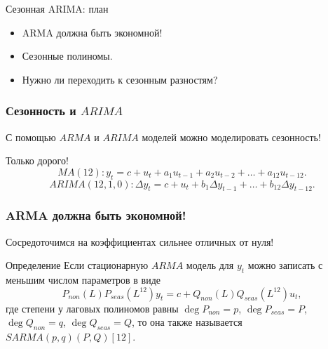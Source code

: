 
\begin{frame} %


\end{frame}



\begin{frame}{Сезонная ARIMA: план}
  \begin{itemize}[<+->]
    \item ARMA должна быть экономной! 
    \item Сезонные полиномы.
    \item Нужно ли переходить к сезонным разностям?
  \end{itemize}

\end{frame}


\begin{frame}
  \frametitle{Сезонность и $ARIMA$}

  С помощью $ARMA$ и $ARIMA$ моделей можно моделировать сезонность!

  \pause
  Только \alert{дорого}!\pause
  \[
   MA(12):     y_t = c + u_t + a_1 u_{t-1} + a_2 u_{t-2} + \ldots + a_{12} u_{t-12}.
  \]
  \[
   ARIMA(12, 1, 0):     \Delta y_t = c + u_t  + b_1 \Delta y_{t-1} + \ldots + b_{12} \Delta y_{t-12}.
  \]

\end{frame}



\begin{frame}
  \frametitle{ARMA должна быть экономной!}

  Сосредоточимся на коэффициентах \alert{сильнее отличных} от нуля!
  \pause
\begin{block}{Определение}
Если стационарную $ARMA$ модель для $y_t$ можно записать с меньшим числом параметров в виде
\[
P_{non}(L)P_{seas}(L^{12}) y_t = c + Q_{non}(L) Q_{seas}(L^{12}) u_t,
\]
где степени у лаговых полиномов равны $\deg P_{non} =p$, $\deg P_{seas} =P$, $\deg Q_{non} =q$, $\deg Q_{seas} =Q$, 
то она также называется $SARMA(p, q)(P, Q)[12]$.
\end{block}
\end{frame}


